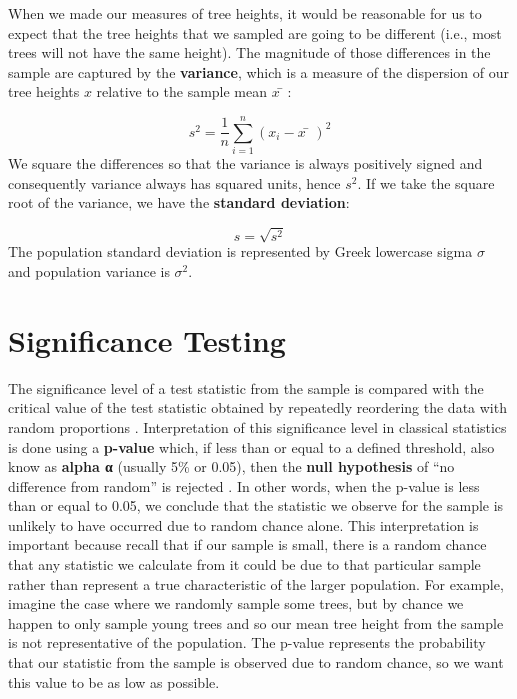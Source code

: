 \documentclass[
]{book}
\begin{document}
When we made our measures of tree heights, it would be reasonable for us to expect that the tree heights that we sampled are going to be different (i.e., most trees will not have the same height). The magnitude of those differences in the sample are captured by the \textbf{variance}, which is a measure of the dispersion of our tree heights \(x\) relative to the sample mean \(x̄\):

\[
s^2 = \frac{1}{n} \sum_{i=1}^{n} (x_i-x̄)^2
\]
We square the differences so that the variance is always positively signed and consequently variance always has squared units, hence \(s^2\). If we take the square root of the variance, we have the \textbf{standard deviation}:

\[
s = \sqrt{s^2}
\]
The population standard deviation is represented by Greek lowercase sigma \(σ\) and population variance is \(σ^2\).

\hypertarget{significance-testing}{%
\section{Significance Testing}\label{significance-testing}}

The significance level of a test statistic from the sample is compared with the critical value of the test statistic obtained by repeatedly reordering the data with random proportions \citep{jacquez_spatial_1999}. Interpretation of this significance level in classical statistics is done using a \textbf{p-value} which, if less than or equal to a defined threshold, also know as \textbf{alpha α} (usually 5\% or 0.05), then the \textbf{null hypothesis} of ``no difference from random'' is rejected \citep{jacquez_spatial_1999}. In other words, when the p-value is less than or equal to 0.05, we conclude that the statistic we observe for the sample is unlikely to have occurred due to random chance alone. This interpretation is important because recall that if our sample is small, there is a random chance that any statistic we calculate from it could be due to that particular sample rather than represent a true characteristic of the larger population. For example, imagine the case where we randomly sample some trees, but by chance we happen to only sample young trees and so our mean tree height from the sample is not representative of the population. The p-value represents the probability that our statistic from the sample is observed due to random chance, so we want this value to be as low as possible.
\end{document}

